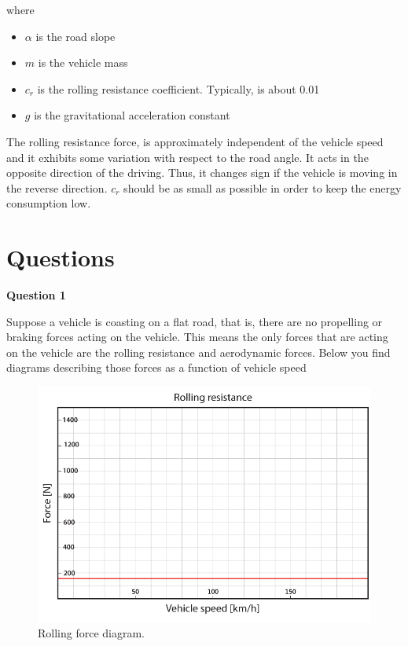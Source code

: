 where 

\begin{itemize}
\item $\alpha$ is the road slope
\item $m$ is the vehicle mass
\item $c_r$ is the rolling resistance coefficient. Typically, is about 0.01 
\item $g$ is the gravitational acceleration constant
\end{itemize}

The rolling resistance force, is approximately independent of the vehicle speed and it exhibits some variation with respect to the road angle. It acts in the opposite direction of the
driving. Thus, it changes sign if the vehicle is moving in the reverse direction. $c_r$ should be as small as possible in order to keep the energy consumption low. 


\section{Questions}


\textbf{Question 1}

Suppose a vehicle is coasting on a flat road, that is, there are no propelling or braking forces acting on the vehicle. This means the only forces that are acting on the vehicle are the rolling resistance and aerodynamic forces. Below you find diagrams describing those forces as a function of vehicle speed

\begin{figure}[!htb]
\begin{center}
\includegraphics[scale=0.280]{img/model_automotive_sys/Diagram_RollingResistance_01.png}
\end{center}
\caption{Rolling force diagram.}
\label{Diagram_RollingResistance_01}
\end{figure}

